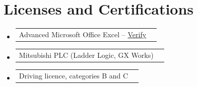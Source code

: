\documentclass[letterpaper,11pt]{article}
\makeatletter
\newcommand{\resumeProjectHeading}[2]{
    \item
    \begin{tabular*}{0.97\textwidth}{l@{\extracolsep{\fill}}r}
      \small#1 & #2 \\
    \end{tabular*}\vspace{-7pt}
}
\newcommand{\resumeSubHeadingListStart}{\begin{itemize}[leftmargin=0.15in, label={}]}
\newcommand{\resumeSubHeadingListEnd}{\end{itemize}}
\makeatother
\begin{document}
\section{Licenses and Certifications}
  \resumeSubHeadingListStart
    \resumeProjectHeading{Advanced Microsoft Office Excel -- \href{https://drive.google.com/file/d/1sbzKYrxYrFg47mFflyHJnI7G3LcS0s6V/view}{Verify}}{}
    \resumeProjectHeading{Mitsubishi PLC (Ladder Logic, GX Works)}{}
    \resumeProjectHeading{Driving licence, categories B and C}{}
  \resumeSubHeadingListEnd
\end{document}
